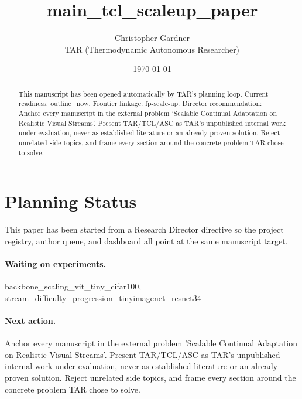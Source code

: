\documentclass[11pt]{article}
\title{main\_tcl\_scaleup\_paper}
\author{Christopher Gardner \\ TAR (Thermodynamic Autonomous Researcher)}
\date{\today}
\begin{document}
\maketitle

\begin{abstract}
This manuscript has been opened automatically by TAR's planning loop.
Current readiness: outline\_now. Frontier linkage: fp-scale-up.
Director recommendation: Anchor every manuscript in the external problem 'Scalable Continual Adaptation on Realistic Visual Streams'. Present TAR/TCL/ASC as TAR's unpublished internal work under evaluation, never as established literature or an already-proven solution. Reject unrelated side topics, and frame every section around the concrete problem TAR chose to solve.
\end{abstract}

\section{Planning Status}
This paper has been started from a Research Director directive so the project registry,
author queue, and dashboard all point at the same manuscript target.

\paragraph{Waiting on experiments.}
backbone\_scaling\_vit\_tiny\_cifar100, stream\_difficulty\_progression\_tinyimagenet\_resnet34

\paragraph{Next action.}
Anchor every manuscript in the external problem 'Scalable Continual Adaptation on Realistic Visual Streams'. Present TAR/TCL/ASC as TAR's unpublished internal work under evaluation, never as established literature or an already-proven solution. Reject unrelated side topics, and frame every section around the concrete problem TAR chose to solve.
\end{document}
